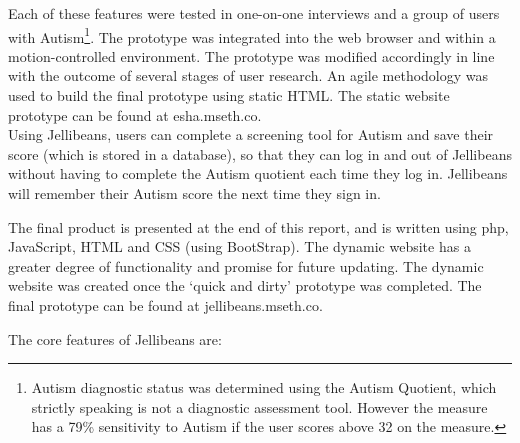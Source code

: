 \documentclass[a4paper, 11pt]{article}
\begin{document}
\vspace{5mm}
Each of these features were tested in one-on-one interviews and a group of users with Autism\footnote{Autism diagnostic status was determined using the Autism Quotient, which strictly speaking is not a diagnostic assessment tool. However the measure has a 79\% sensitivity to Autism if the user scores above 32 on the measure.}. The prototype was integrated into the web browser and within a motion-controlled environment. The prototype was modified accordingly in line with the outcome of several stages of user research. An agile methodology was used to build the final prototype using static HTML. The static website prototype can be found at esha.mseth.co. \\

\vspace{5mm}
Using Jellibeans, users can complete a screening tool for Autism and save their score (which is stored in a database), so that they can log in and out of Jellibeans without having to complete the Autism quotient each time they log in. Jellibeans will remember their Autism score the next time they sign in.

\vspace{5mm}
The final product is presented at the end of this report, and is written using php, JavaScript, HTML and CSS (using BootStrap). The dynamic website has a greater degree of functionality and promise for future updating. The dynamic website was created once the `quick and dirty' prototype was completed. The final prototype can be found at jellibeans.mseth.co.

\vspace{5mm}
The core features of Jellibeans are:
\end{document}

